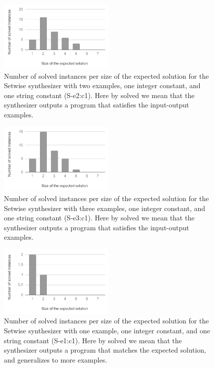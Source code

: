 \begin{figure}
  \centering
  \includegraphics[width=0.5\textwidth]{assets/bar-chart-solved-S-e2-c1.pdf}
  \caption{Number of solved instances per size of the expected solution for
    the Setwise synthesizer with two examples, one integer constant, and one
    string constant (S-e2:c1). Here by solved we mean that the synthesizer
    outputs a program that satisfies the input-output examples.}
  \label{fig:bar-chart-solved-S-e2-c1}
\end{figure}

\begin{figure}
  \centering
  \includegraphics[width=0.5\textwidth]{assets/bar-chart-solved-S-e3-c1.pdf}
  \caption{Number of solved instances per size of the expected solution for
    the Setwise synthesizer with three examples, one integer constant, and one
    string constant (S-e3:c1). Here by solved we mean that the synthesizer
    outputs a program that satisfies the input-output examples.}
  \label{fig:bar-chart-solved-S-e3-c1}
\end{figure}

\begin{figure}
  \centering
  \includegraphics[width=0.5\textwidth]{assets/bar-chart-expected-S-e1-c1.pdf}
  \caption{Number of solved instances per size of the expected solution for
    the Setwise synthesizer with one example, one integer constant, and one
    string constant (S-e1:c1). Here by solved we mean that the synthesizer
    outputs a program that matches the expected solution, and generalizes to
    more examples.}
  \label{fig:bar-chart-expected-S-e1-c1}
\end{figure}

